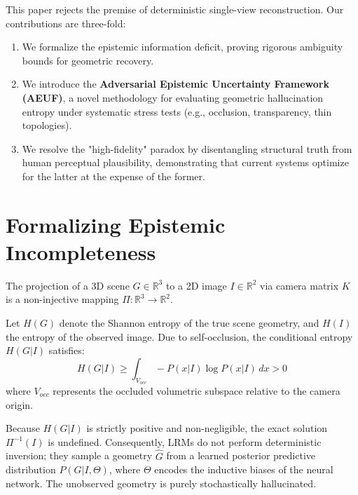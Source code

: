 \documentclass[10pt,journal,compsoc]{IEEEtran}
\begin{document}
This paper rejects the premise of deterministic single-view reconstruction. Our contributions are three-fold:
\begin{enumerate}
    \item We formalize the epistemic information deficit, proving rigorous ambiguity bounds for geometric recovery.
    \item We introduce the \textbf{Adversarial Epistemic Uncertainty Framework (AEUF)}, a novel methodology for evaluating geometric hallucination entropy under systematic stress tests (e.g., occlusion, transparency, thin topologies).
    \item We resolve the "high-fidelity" paradox by disentangling structural truth from human perceptual plausibility, demonstrating that current systems optimize for the latter at the expense of the former.
\end{enumerate}

\section{Formalizing Epistemic Incompleteness}
The projection of a 3D scene $G \in \mathbb{R}^3$ to a 2D image $I \in \mathbb{R}^2$ via camera matrix $K$ is a non-injective mapping $\Pi: \mathbb{R}^3 \to \mathbb{R}^2$. 

\begin{theorem}
Let $H(G)$ denote the Shannon entropy of the true scene geometry, and $H(I)$ the entropy of the observed image. Due to self-occlusion, the conditional entropy $H(G | I)$ satisfies:
\[ H(G | I) \ge \int_{V_{occ}} -P(x|I)\log P(x|I) \, dx > 0 \]
where $V_{occ}$ represents the occluded volumetric subspace relative to the camera origin.
\end{theorem}

Because $H(G | I)$ is strictly positive and non-negligible, the exact solution $\Pi^{-1}(I)$ is undefined. Consequently, LRMs do not perform deterministic inversion; they sample a geometry $\hat{G}$ from a learned posterior predictive distribution $P(G | I, \Theta)$, where $\Theta$ encodes the inductive biases of the neural network. The unobserved geometry is purely stochastically hallucinated.
\end{document}
